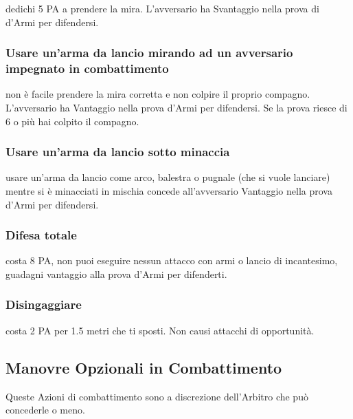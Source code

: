 \documentclass[12pt,a4paper,twoside,openany]{book}
\begin{document}
\begin{multicols}{2}
dedichi 5 PA a prendere la mira. L'avversario ha Svantaggio nella prova di d'Armi per difendersi.

\subsubsection{Usare un'arma da lancio mirando ad un avversario impegnato in combattimento} \label{usarearmalancioinmischia}

non è facile prendere la mira corretta e non colpire il proprio compagno. L'avversario ha Vantaggio nella prova d'Armi per difendersi. Se la prova riesce di 6 o più hai colpito il compagno.

\subsubsection{Usare un'arma da lancio sotto minaccia} \label{usarearmalanciosottominaccia}

usare un'arma da lancio come arco, balestra o pugnale (che si vuole lanciare) mentre si è minacciati in mischia concede all'avversario Vantaggio nella prova d'Armi per difendersi.

\subsubsection{Difesa totale} \label{difesatotale}

costa 8 PA, non puoi eseguire nessun attacco con armi o lancio di incantesimo, guadagni vantaggio alla prova d'Armi per difenderti.

\subsubsection{Disingaggiare} \label{disingaggiare}

costa 2 PA per 1.5 metri che ti sposti. Non causi attacchi di opportunità.

\subsection{Manovre Opzionali in Combattimento}\label{azioniopzionaliincombattimento}

Queste Azioni di combattimento sono a discrezione dell'Arbitro che può concederle o meno.


\end{multicols}
\end{document}
